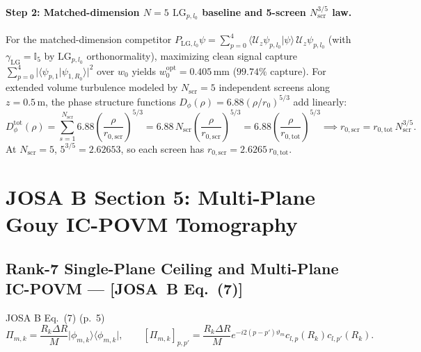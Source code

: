 \documentclass[10pt,letterpaper]{article}
\newcommand{\braket}[2]{\langle #1 | #2 \rangle}
\newcommand{\ket}[1]{\lvert #1 \rangle}
\newcommand{\bra}[1]{\langle #1 \rvert}
\newcommand{\abs}[1]{\lvert #1 \rvert}
\newcommand{\josb}[1]{\textbf{[JOSA~B Eq.~(#1)]}}
\numberwithin{equation}{section}
\begin{document}
\paragraph*{Step 2: Matched-dimension $N=5$ $\mathrm{LG}_{p,l_0}$ baseline and 5-screen $N_{\mathrm{scr}}^{3/5}$ law.}
For the matched-dimension competitor $P_{\mathrm{LG},l_0}\psi = \sum_{p=0}^4 \braket{\mathcal{U}_z\psi_{p,l_0}}{\psi}\,\mathcal{U}_z\psi_{p,l_0}$ (with $\gamma_{\mathrm{LG}} = \mathbb{I}_5$ by $\mathrm{LG}_{p,l_0}$ orthonormality), maximizing clean signal capture $\sum_{p=0}^4\abs{\braket{\psi_{p,1}}{\psi_{1,R_0}}}^2$ over $w_0$ yields $w_0^{\mathrm{opt}} = 0.405\,\mathrm{mm}$ ($99.74\%$ capture). For extended volume turbulence modeled by $N_{\mathrm{scr}} = 5$ independent screens along $z = 0.5\,\mathrm{m}$, the phase structure functions $D_\phi(\rho) = 6.88(\rho/r_0)^{5/3}$ add linearly:
\begin{equation}
  D_\phi^{\mathrm{tot}}(\rho) = \sum_{s=1}^{N_{\mathrm{scr}}} 6.88\left(\frac{\rho}{r_{0,\mathrm{scr}}}\right)^{5/3} = 6.88\,N_{\mathrm{scr}}\left(\frac{\rho}{r_{0,\mathrm{scr}}}\right)^{5/3} = 6.88\left(\frac{\rho}{r_{0,\mathrm{tot}}}\right)^{5/3} \implies r_{0,\mathrm{scr}} = r_{0,\mathrm{tot}}\,N_{\mathrm{scr}}^{3/5}.
\end{equation}
At $N_{\mathrm{scr}} = 5$, $5^{3/5} = 2.62653$, so each screen has $r_{0,\mathrm{scr}} = 2.6265\,r_{0,\mathrm{tot}}$.

\section{JOSA B Section 5: Multi-Plane Gouy IC-POVM Tomography}
\label{sec:b5}

\subsection{Rank-7 Single-Plane Ceiling and Multi-Plane IC-POVM --- \josb{7}}
\label{sec:b5_povm}

\begin{targeteq}{JOSA B Eq.~(7) (p.~5)}
\[
  \Pi_{m,k} = \frac{R_k\Delta R}{M}\ket{\phi_{m,k}}\bra{\phi_{m,k}}, \qquad [\Pi_{m,k}]_{p,p'} = \frac{R_k\Delta R}{M} e^{-i 2(p-p')\vartheta_m} c_{l,p}(R_k) c_{l,p'}(R_k).
\]
\end{targeteq}
\end{document}
